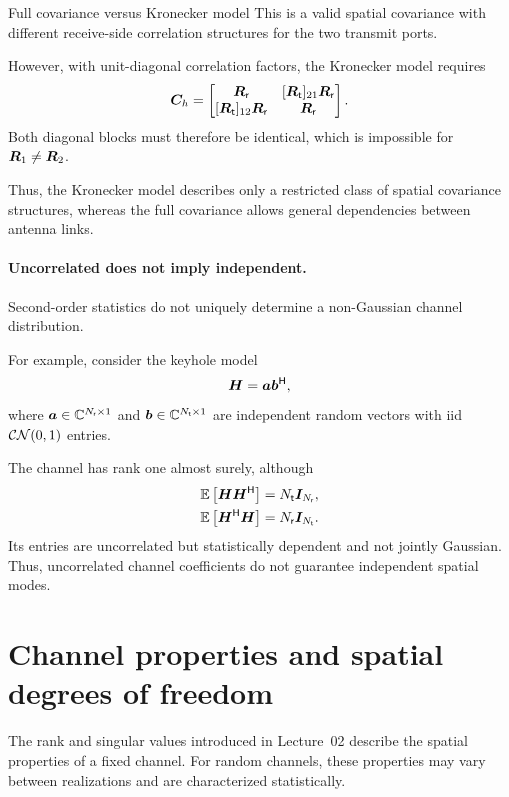 \begin{example}{Full covariance versus Kronecker model}
	This is a valid spatial covariance with
	different receive-side correlation structures
	for the two transmit ports.
	
	However, with unit-diagonal correlation factors,
	the Kronecker model requires
	\begin{equation*}
		\ma{C}_h
		=
		\begin{bmatrix}
			\ma{R}_{\mathsf r}
			&[\ma{R}_{\mathsf t}]_{21}\ma{R}_{\mathsf r}\\
			[\ma{R}_{\mathsf t}]_{12}\ma{R}_{\mathsf r}
			&\ma{R}_{\mathsf r}
		\end{bmatrix}.
	\end{equation*}
	Both diagonal blocks must therefore be identical,
	which is impossible for $\bm{R}_1\neq\bm{R}_2$.
	
	Thus, the Kronecker model describes only a
	restricted class of spatial covariance structures,
	whereas the full covariance allows general
	dependencies between antenna links.
\end{example}
\paragraph{Uncorrelated does not imply independent.}
Second-order statistics do not uniquely determine
a non-Gaussian channel distribution.

For example, consider the keyhole model
\begin{equation*}
	\bm{H}=\bm{a}{\bm{b}}^{\mathsf{H}},
\end{equation*}
where $\bm{a}\in\mathbb{C}^{N_{\mathsf{r}}\times1}$ and
$\bm{b}\in\mathbb{C}^{N_{\mathsf{t}}\times1}$ are independent
random vectors with \ac{iid}
$\mathcal{CN}(0,1)$ entries.

The channel has rank one almost surely,
although
\begin{align*}
	\mathbb{E}\left[\bm{H}{\bm{H}}^{\mathsf{H}}\right]
	&=N_{\mathsf{t}}\bm{I}_{N_{\mathsf{r}}},\\
	\mathbb{E}\left[{\bm{H}}^{\mathsf{H}}\bm{H}\right]
	&=N_{\mathsf{r}}\bm{I}_{N_{\mathsf{t}}}.
\end{align*}
Its entries are uncorrelated but statistically
dependent and not jointly Gaussian.
Thus, uncorrelated channel coefficients
do not guarantee independent spatial modes.


\section{Channel properties and spatial degrees of freedom}
\label{sec:properties}

The rank and singular values introduced in Lecture~02
describe the spatial properties of a fixed channel.
For random channels, these properties may vary between
realizations and are characterized statistically.

